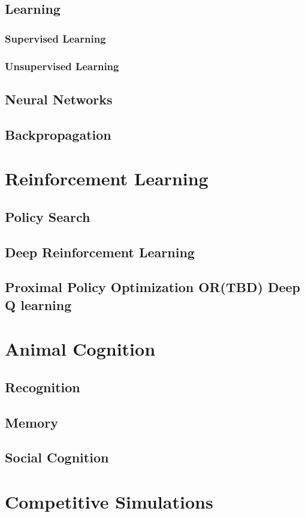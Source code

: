 \section{Learning}
\subsection{Supervised Learning}
\subsection{Unsupervised Learning}
\section{Neural Networks}
\section{Backpropagation}

\chapter{Reinforcement Learning}
\section{Policy Search}
\section{Deep Reinforcement Learning}
\section{Proximal Policy Optimization OR(TBD) Deep Q learning}

\chapter{Animal Cognition}
\section{Recognition}
\section{Memory}
\section{Social Cognition}

\chapter{Competitive Simulations}%


